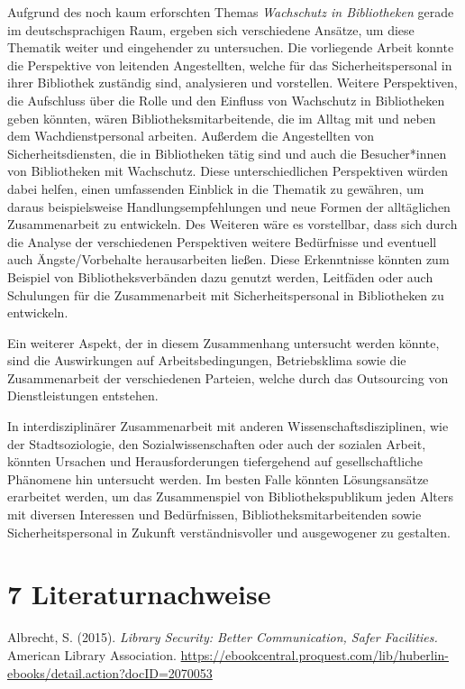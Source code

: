 \documentclass[a4paper,
fontsize=11pt,
oneside,
numbers=noperiodatend,
parskip=half-,
bibliography=totoc,
final
]{scrartcl}
\begin{document}
Aufgrund des noch kaum erforschten Themas \emph{Wachschutz in
Bibliotheken} gerade im deutschsprachigen Raum, ergeben sich
verschiedene Ansätze, um diese Thematik weiter und eingehender zu
untersuchen. Die vorliegende Arbeit konnte die Perspektive von leitenden
Angestellten, welche für das Sicherheitspersonal in ihrer Bibliothek
zuständig sind, analysieren und vorstellen. Weitere Perspektiven, die
Aufschluss über die Rolle und den Einfluss von Wachschutz in
Bibliotheken geben könnten, wären Bibliotheksmitarbeitende, die im
Alltag mit und neben dem Wachdienstpersonal arbeiten. Außerdem die
Angestellten von Sicherheitsdiensten, die in Bibliotheken tätig sind und
auch die Besucher*innen von Bibliotheken mit Wachschutz. Diese
unterschiedlichen Perspektiven würden dabei helfen, einen umfassenden
Einblick in die Thematik zu gewähren, um daraus beispielsweise
Handlungsempfehlungen und neue Formen der alltäglichen Zusammenarbeit zu
entwickeln. Des Weiteren wäre es vorstellbar, dass sich durch die
Analyse der verschiedenen Perspektiven weitere Bedürfnisse und eventuell
auch Ängste/Vorbehalte herausarbeiten ließen. Diese Erkenntnisse könnten
zum Beispiel von Bibliotheksverbänden dazu genutzt werden, Leitfäden
oder auch Schulungen für die Zusammenarbeit mit Sicherheitspersonal in
Bibliotheken zu entwickeln.

Ein weiterer Aspekt, der in diesem Zusammenhang untersucht werden
könnte, sind die Auswirkungen auf Arbeitsbedingungen, Betriebsklima
sowie die Zusammenarbeit der verschiedenen Parteien, welche durch das
Outsourcing von Dienstleistungen entstehen.

In interdisziplinärer Zusammenarbeit mit anderen
Wissenschaftsdisziplinen, wie der Stadtsoziologie, den
Sozialwissenschaften oder auch der sozialen Arbeit, könnten Ursachen und
Herausforderungen tiefergehend auf gesellschaftliche Phänomene hin
untersucht werden. Im besten Falle könnten Lösungsansätze erarbeitet
werden, um das Zusammenspiel von Bibliothekspublikum jeden Alters mit
diversen Interessen und Bedürfnissen, Bibliotheksmitarbeitenden sowie
Sicherheitspersonal in Zukunft verständnisvoller und ausgewogener zu
gestalten.

\hypertarget{literaturnachweise}{%
\section{7 Literaturnachweise}\label{literaturnachweise}}

Albrecht, S. (2015). \emph{Library Security: Better Communication, Safer
Facilities.} American Library Association.
\url{https://ebookcentral.proquest.com/lib/huberlin-ebooks/detail.action?docID=2070053}
\end{document}
